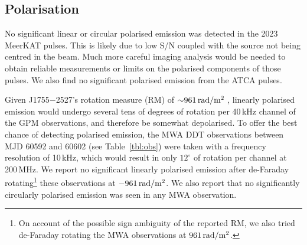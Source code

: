 \documentclass[fleqn,usenatbib]{mnras}
\newcommand{\src}{J1755$-$2527}
\newcommand{\Tab}{Table}
\begin{document}


\subsection{Polarisation} \label{sec:polarisation}

No significant linear or circular polarised emission was detected in the 2023 MeerKAT pulses.
This is likely due to low S/N coupled with the source not being centred in the beam.
Much more careful imaging analysis would be needed to obtain reliable measurements or limits on the polarised components of those pulses.
We also find no significant polarised emission from the ATCA pulses.

Given \src{}'s rotation measure (RM) of ${\sim}961\,{\rm rad}/{\rm m}^2$ , linearly polarised emission would undergo several tens of degrees of rotation per 40\,kHz channel of the GPM observations, and therefore be somewhat depolarised.
To offer the best chance of detecting polarised emission, the MWA DDT observations between MJD 60592 and 60602 (see \Tab~\ref{tbl:obs}) were taken with a frequency resolution of 10\,kHz, which would result in only $12^\circ$ of rotation per channel at 200\,MHz.
We report no significant linearly polarised emission after de-Faraday rotating\footnote{On account of the possible sign ambiguity of the reported RM, we also tried de-Faraday rotating the MWA observations at $961\,{\rm rad}/{\rm m}^2$.} these observations at $-961\,{\rm rad}/{\rm m}^2$.
We also report that no significantly circularly polarised emission was seen in any MWA observation.
\end{document}
